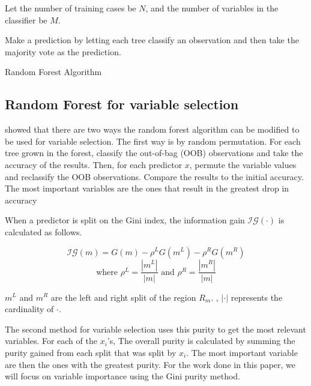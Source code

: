 \documentclass[twoside,11pt]{article}
\begin{document}
\begin{algorithm}
Let the number of training cases be $N$, and the number of variables in the classifier be $M$.

Make a prediction by letting each tree classify an observation and then take the majority vote as the prediction.
\caption{Random Forest Algorithm}\label{algo: RandomForest}
\end{algorithm}

\subsection{Random Forest for variable selection}
\citet{Breiman01} showed that there are two ways the random forest algorithm can be modified to be used for variable selection. The first way is by random permutation. For each tree grown in the forest, classify the out-of-bag (OOB) observations and take the accuracy of the results. Then, for each predictor $x$, permute the variable values and reclassify the OOB observations. Compare the results to the initial accuracy. The most important variables are the ones that result in the greatest drop in accuracy

When a predictor is split on the Gini index, the information gain $\mathcal{IG}(\cdot)$ is calculated as follows. 

\begin{equation}\label{eqn:Delta Function}
	\mathcal{IG}(m)=G(m)-\rho^L G(m^L)-\rho^R G(m^R) 
\end{equation}
\begin{equation}
	\text{where } \rho^L = \frac{|m^L|}{|m|} \text{ and } \rho^R = \frac{|m^R|}{|m|}
\end{equation}
	



$m^L$ and $m^R$ are the left and right split of the region $R_m$. , $|\cdot|$ represents the cardinality of $\cdot$. 

The second method for variable selection uses this purity to get the most relevant variables. For each of the $x_i$'s, The overall purity is calculated by summing the purity gained from each split that was split by $x_i$. The most important variable are then the ones with the greatest purity. For the work done in this paper, we will focus on variable importance using the Gini purity method. 	
\end{document}
